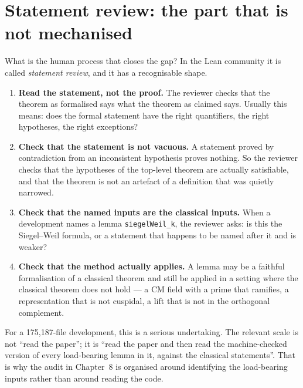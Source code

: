 \section{Statement review: the part that is not mechanised}What is the human process that closes the gap? In the Lean community it is
called \emph{statement review}, and it has a recognisable shape.

\begin{enumerate}
\item \textbf{Read the statement, not the proof.} The reviewer checks that the
theorem as formalised says what the theorem as claimed says. Usually this
means: does the formal statement have the right quantifiers, the right
hypotheses, the right exceptions?
\item \textbf{Check that the statement is not vacuous.} A statement proved by
contradiction from an inconsistent hypothesis proves nothing. So the reviewer
checks that the hypotheses of the top-level theorem are actually satisfiable,
and that the theorem is not an artefact of a definition that was quietly
narrowed.
\item \textbf{Check that the named inputs are the classical inputs.} When a
development names a lemma \texttt{siegelWeil\_k}, the reviewer asks: is this
the Siegel--Weil formula, or a statement that happens to be named after it and
is weaker?
\item \textbf{Check that the method actually applies.} A lemma may be a faithful
formalisation of a classical theorem and still be applied in a setting where the
classical theorem does not hold --- a CM field with a prime that ramifies, a
representation that is not cuspidal, a lift that is not in the orthogonal
complement.
\end{enumerate}

For a 175{,}187-file development, this is a serious undertaking. The relevant
scale is not ``read the paper''; it is ``read the paper and then read the
machine-checked version of every load-bearing lemma in it, against the
classical statements''. That is why the audit in Chapter~8 is organised around
identifying the load-bearing inputs rather than around reading the code.

